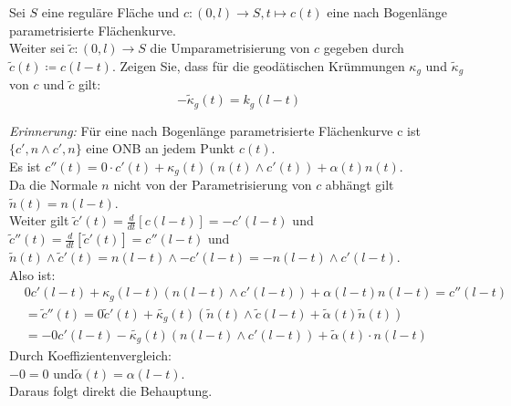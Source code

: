 \begin{assignment}
  Sei \( S \) eine reguläre Fläche und \( c: (0,l) \to S, t \mapsto c(t) \) eine nach Bogenlänge parametrisierte Flächenkurve. \\
  Weiter sei \( \tilde{ c } : (0,l) \to S \) die Umparametrisierung von \( c \) gegeben durch \( \tilde{ c }(t) \coloneqq c(l-t) \). Zeigen Sie, dass für die geodätischen Krümmungen \( \kappa_g \) und \( \tilde{ \kappa }_g \) von \( c \) und \( \tilde{ c } \) gilt: 
  \begin{equation*}
    -\tilde{\kappa}_g(t) = k_g(l-t) 
  \end{equation*}
\end{assignment}
\begin{solution}
  \emph{Erinnerung:} Für eine nach Bogenlänge parametrisierte Flächenkurve c ist \( \{ c', n \land c', n \} \) eine ONB an jedem Punkt \( c(t) \). \\
  Es ist \( c''(t) = 0 \cdot c'(t) + \kappa_g(t)(n(t) \land c'(t)) + \alpha(t) n(t) \). \\
  Da die Normale \( n \) nicht von der Parametrisierung von \( c \) abhängt gilt \( \tilde{n}(t) = n(l-t) \). \\
  Weiter gilt \( \tilde{c}'(t) = \frac{d}{dt}[c(l-t)] = - c'(l-t) \) und \\
  \( \tilde{c}''(t) = \frac{d}{dt}[\tilde{c}'(t)] = c''(l-t) \) und \\
  \( \tilde{n}(t) \land \tilde{c}'(t) = n(l-t) \land - c'(l-t) = -n (l-t) \land c'(l-t) \). \\
  Also ist:
  \begin{align*}
    & 0c'(l-t) + \kappa_g(l-t)(n(l-t) \land c'(l-t)) + \alpha(l-t)n(l-t) = c''(l-t) \\
    &= \tilde{c}''(t) = 0\tilde{c}'(t) + \tilde{\kappa_g}(t)(\tilde{n}(t) \land \tilde{c}(l-t) + \tilde{\alpha}(t) \tilde{n}(t)) \\
    &= -0 c'(l-t) - \tilde{\kappa_g}(t)(n(l-t) \land c'(l-t)) + \tilde{\alpha}(t) \cdot n(l-t)
  \end{align*}
  Durch Koeffizientenvergleich: \\
  \( -0 = 0 \text{ und} \tilde{\alpha}(t) = \alpha(l-t) \). \\
  Daraus folgt direkt die Behauptung.
\end{solution}

%
